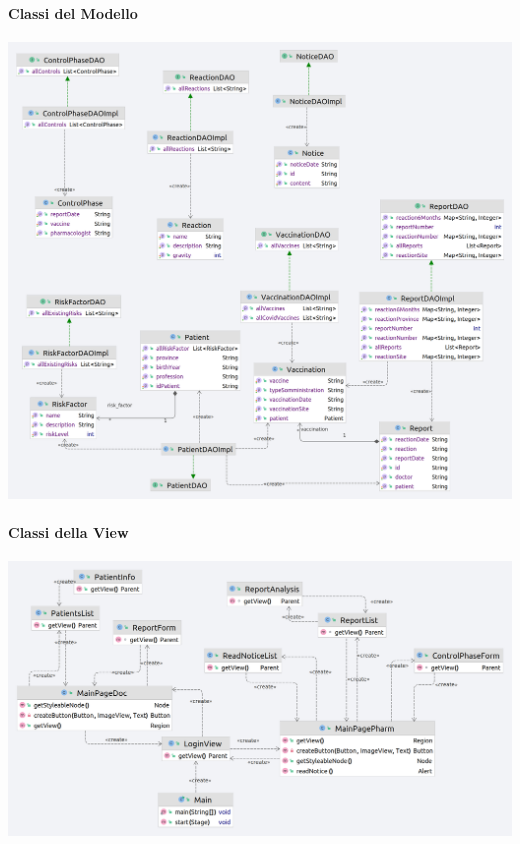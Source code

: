 \documentclass{article}
\begin{document}
    \paragraph*{Classi del Modello}
        \begin{center}
            \includegraphics[width=1\textwidth]{pictures/DAOInteraction.png}
        \end{center}
\newpage
    \paragraph*{Classi della View}
        \begin{center}
            \includegraphics[width=1\textwidth]{pictures/ViewInteraction.png}
        \end{center}
\end{document}
